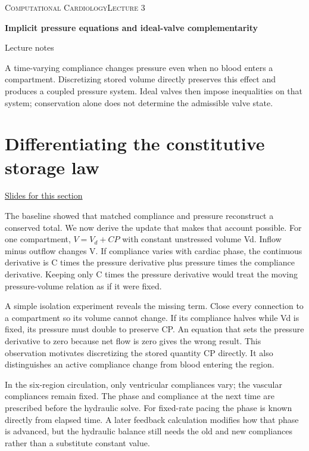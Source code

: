 \documentclass[11pt,letterpaper]{article}
\theoremstyle{definition}\newtheorem{definition}{Definition}\newtheorem{example}{Example}
\numberwithin{equation}{section}
\begin{document}
{\small\scshape Computational Cardiology\hfill Lecture 3}\par\medskip
{\raggedright{}\LARGE\bfseries\color{ink} Implicit pressure equations and ideal-valve complementarity\par}\medskip
{\small Lecture notes}\par\bigskip
A time-varying compliance changes pressure even when no blood enters a compartment. Discretizing stored volume directly preserves this effect and produces a coupled pressure system. Ideal valves then impose inequalities on that system; conservation alone does not determine the admissible valve state.

\section{Differentiating the constitutive storage law}
\hypertarget{note-differentiating-the-constitutive-storage-law}{}\label{note:differentiating-the-constitutive-storage-law}
{\small \href{slides.html\#frame=the-stored-quantity\&step=1}{Slides for this section}}\par
The baseline showed that matched compliance and pressure reconstruct a conserved total. We now derive the update that makes that account possible. For one compartment, $V=V_d+CP$ with constant unstressed volume Vd. Inflow minus outflow changes V. If compliance varies with cardiac phase, the continuous derivative is C times the pressure derivative plus pressure times the compliance derivative. Keeping only C times the pressure derivative would treat the moving pressure-volume relation as if it were fixed.

A simple isolation experiment reveals the missing term. Close every connection to a compartment so its volume cannot change. If its compliance halves while Vd is fixed, its pressure must double to preserve CP. An equation that sets the pressure derivative to zero because net flow is zero gives the wrong result. This observation motivates discretizing the stored quantity CP directly. It also distinguishes an active compliance change from blood entering the region.

In the six-region circulation, only ventricular compliances vary; the vascular compliances remain fixed. The phase and compliance at the next time are prescribed before the hydraulic solve. For fixed-rate pacing the phase is known directly from elapsed time. A later feedback calculation modifies how that phase is advanced, but the hydraulic balance still needs the old and new compliances rather than a substitute constant value.
\end{document}
